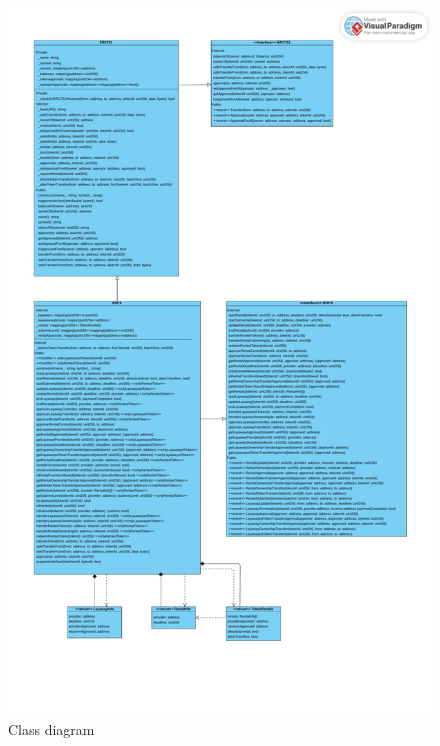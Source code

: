 \documentclass[english, LaM, oneside]{sapthesis}%
\begin{document}
\begin{figure}
    \centering
        \begin{adjustbox}{width=0.9\textwidth}
            \includegraphics{ClassDiagrams/classDiagram.pdf}
        \end{adjustbox}
    \caption{Class diagram}
    \label{fig:Class diagram}
\end{figure}
\end{document}
